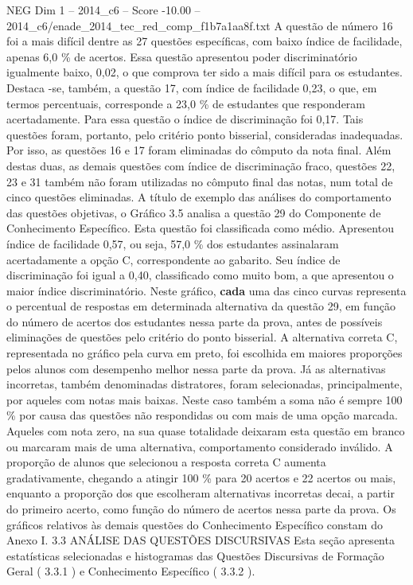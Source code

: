 \begin{textsample}{NEG Dim 1 – 2014\_c6 – Score -10.00 – 2014\_c6/enade\_2014\_tec\_red\_comp\_f1b7a1aa8f.txt}
A questão de número 16 foi a mais difícil dentre as 27 questões específicas, com baixo índice de facilidade, apenas 6,0 \% de acertos.
Essa questão apresentou poder discriminatório igualmente baixo, 0,02, o que comprova ter sido a mais difícil para os estudantes.
Destaca -se, também, a questão 17, com índice de facilidade 0,23, o que, em termos percentuais, corresponde a 23,0 \% de estudantes que responderam acertadamente.
Para essa questão o índice de discriminação foi 0,17.
Tais questões foram, portanto, pelo critério ponto bisserial, consideradas inadequadas.
Por isso, as questões 16 e 17 foram eliminadas do cômputo da nota final.
Além destas duas, as demais questões com índice de discriminação fraco, questões 22, 23 e 31 também não foram utilizadas no cômputo final das notas, num total de cinco questões eliminadas.
A título de exemplo das análises do comportamento das questões objetivas, o Gráfico 3.5 analisa a questão 29 do Componente de Conhecimento Específico.
Esta questão foi classificada como médio.
Apresentou índice de facilidade 0,57, ou seja, 57,0 \% dos estudantes assinalaram acertadamente a opção C, correspondente ao gabarito.
Seu índice de discriminação foi igual a 0,40, classificado como muito bom, a que apresentou o maior índice discriminatório.
Neste gráfico, \textbf{cada} uma das cinco curvas representa o percentual de respostas em determinada alternativa da questão 29, em função do número de acertos dos estudantes nessa parte da prova, antes de possíveis eliminações de questões pelo critério do ponto bisserial.
A alternativa correta C, representada no gráfico pela curva em preto, foi escolhida em maiores proporções pelos alunos com desempenho melhor nessa parte da prova.
Já as alternativas incorretas, também denominadas distratores, foram selecionadas, principalmente, por aqueles com notas mais baixas.
Neste caso também a soma não é sempre 100 \% por causa das questões não respondidas ou com mais de uma opção marcada.
Aqueles com nota zero, na sua quase totalidade deixaram esta questão em branco ou marcaram mais de uma alternativa, comportamento considerado inválido.
A proporção de alunos que selecionou a resposta correta C aumenta gradativamente, chegando a atingir 100 \% para 20 acertos e 22 acertos ou mais, enquanto a proporção dos que escolheram alternativas incorretas decai, a partir do primeiro acerto, como função do número de acertos nessa parte da prova.
Os gráficos relativos às demais questões do Conhecimento Específico constam do Anexo I. 3.3 ANÁLISE DAS QUESTÕES DISCURSIVAS Esta seção apresenta estatísticas selecionadas e histogramas das Questões Discursivas de Formação Geral ( 3.3.1 ) e Conhecimento Específico ( 3.3.2 ).

\end{textsample}
